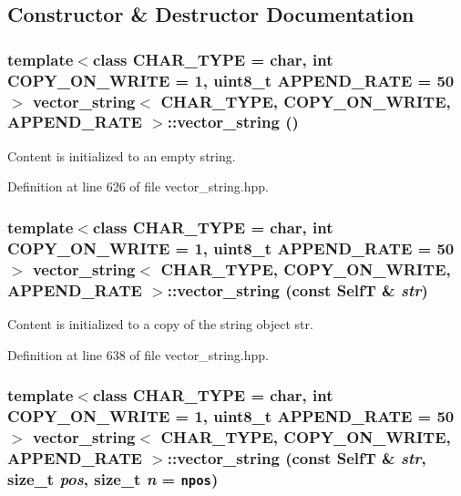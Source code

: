 \subsection{Constructor \& Destructor Documentation}
\hypertarget{classvector__string_074fd3f1b50a4daea063d45f9d30d32a}{
\subsubsection[{vector\_\-string}]{\setlength{\rightskip}{0pt plus 5cm}template$<$class CHAR\_\-TYPE  = char, int COPY\_\-ON\_\-WRITE = 1, uint8\_\-t APPEND\_\-RATE = 50$>$ {\bf vector\_\-string}$<$ CHAR\_\-TYPE, COPY\_\-ON\_\-WRITE, APPEND\_\-RATE $>$::{\bf vector\_\-string} ()}}
\label{classvector__string_074fd3f1b50a4daea063d45f9d30d32a}


Content is initialized to an empty string. 

Definition at line 626 of file vector\_\-string.hpp.\hypertarget{classvector__string_0965d3e8de0658ee5223187ce1d7ff48}{
\subsubsection[{vector\_\-string}]{\setlength{\rightskip}{0pt plus 5cm}template$<$class CHAR\_\-TYPE  = char, int COPY\_\-ON\_\-WRITE = 1, uint8\_\-t APPEND\_\-RATE = 50$>$ {\bf vector\_\-string}$<$ CHAR\_\-TYPE, COPY\_\-ON\_\-WRITE, APPEND\_\-RATE $>$::{\bf vector\_\-string} (const {\bf SelfT} \& {\em str})}}
\label{classvector__string_0965d3e8de0658ee5223187ce1d7ff48}


Content is initialized to a copy of the string object str. 

Definition at line 638 of file vector\_\-string.hpp.\hypertarget{classvector__string_14f2042cf130292b381a8073fc804ccc}{
\subsubsection[{vector\_\-string}]{\setlength{\rightskip}{0pt plus 5cm}template$<$class CHAR\_\-TYPE  = char, int COPY\_\-ON\_\-WRITE = 1, uint8\_\-t APPEND\_\-RATE = 50$>$ {\bf vector\_\-string}$<$ CHAR\_\-TYPE, COPY\_\-ON\_\-WRITE, APPEND\_\-RATE $>$::{\bf vector\_\-string} (const {\bf SelfT} \& {\em str}, \/  size\_\-t {\em pos}, \/  size\_\-t {\em n} = {\tt {\bf npos}})}}
\label{classvector__string_14f2042cf130292b381a8073fc804ccc}


